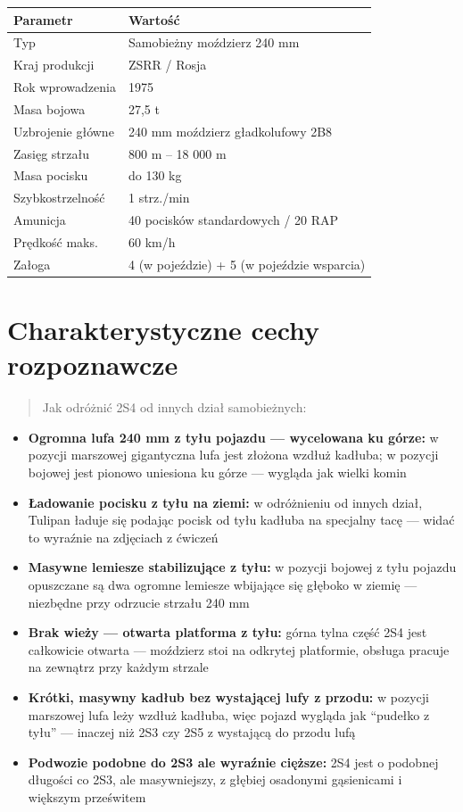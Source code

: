 \documentclass[12pt,openany,oneside]{book}
\providecommand{\tightlist}{%
  \setlength{\itemsep}{0pt}\setlength{\parskip}{0pt}}
\begin{document}
\begin{longtable}[]{@{}ll@{}}
\toprule\noalign{}
Parametr & Wartość \\
\midrule\noalign{}
\endhead
\bottomrule\noalign{}
\endlastfoot
Typ & Samobieżny moździerz 240 mm \\
Kraj produkcji & ZSRR / Rosja \\
Rok wprowadzenia & 1975 \\
Masa bojowa & 27,5 t \\
Uzbrojenie główne & 240 mm moździerz gładkolufowy 2B8 \\
Zasięg strzału & 800 m -- 18 000 m \\
Masa pocisku & do 130 kg \\
Szybkostrzelność & 1 strz./min \\
Amunicja & 40 pocisków standardowych / 20 RAP \\
Prędkość maks. & 60 km/h \\
Załoga & 4 (w pojeździe) + 5 (w pojeździe wsparcia) \\
\end{longtable}

\section{Charakterystyczne cechy
rozpoznawcze}\label{charakterystyczne-cechy-rozpoznawcze-14}

\begin{quote}
Jak odróżnić 2S4 od innych dział samobieżnych:
\end{quote}

\begin{itemize}
\tightlist
\item
  \textbf{Ogromna lufa 240 mm z tyłu pojazdu --- wycelowana ku górze:} w
  pozycji marszowej gigantyczna lufa jest złożona wzdłuż kadłuba; w
  pozycji bojowej jest pionowo uniesiona ku górze --- wygląda jak wielki
  komin
\item
  \textbf{Ładowanie pocisku z tyłu na ziemi:} w odróżnieniu od innych
  dział, Tulipan ładuje się podając pocisk od tyłu kadłuba na specjalny
  tacę --- widać to wyraźnie na zdjęciach z ćwiczeń
\item
  \textbf{Masywne lemiesze stabilizujące z tyłu:} w pozycji bojowej z
  tyłu pojazdu opuszczane są dwa ogromne lemiesze wbijające się głęboko
  w ziemię --- niezbędne przy odrzucie strzału 240 mm
\item
  \textbf{Brak wieży --- otwarta platforma z tyłu:} górna tylna część
  2S4 jest całkowicie otwarta --- moździerz stoi na odkrytej platformie,
  obsługa pracuje na zewnątrz przy każdym strzale
\item
  \textbf{Krótki, masywny kadłub bez wystającej lufy z przodu:} w
  pozycji marszowej lufa leży wzdłuż kadłuba, więc pojazd wygląda jak
  ``pudełko z tyłu'' --- inaczej niż 2S3 czy 2S5 z wystającą do przodu
  lufą
\item
  \textbf{Podwozie podobne do 2S3 ale wyraźnie cięższe:} 2S4 jest o
  podobnej długości co 2S3, ale masywniejszy, z głębiej osadonymi
  gąsienicami i większym prześwitem
\end{itemize}
\end{document}
